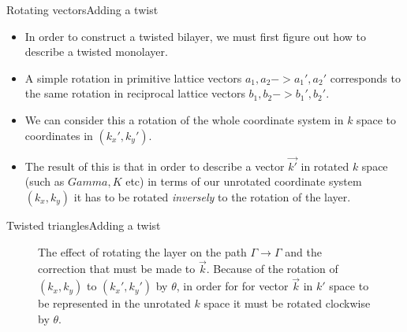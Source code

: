\documentclass[9pt]{beamer}
\begin{document}
\begin{frame}{Rotating vectors}{Adding a twist}
  \begin{itemize}
    \item In order to construct a twisted bilayer, we must first figure out how to describe a twisted monolayer.

    \item A simple rotation in primitive lattice vectors $a_1, a_2 -> a_1', a_2'$ corresponds to the same rotation in reciprocal lattice vectors $b_1, b_2 -> b_1', b_2'$.

    \item We can consider this a rotation of the whole coordinate system in $k$ space to coordinates in $(k_x', k_y')$.

    \item The result of this is that in order to describe a vector $\vec{k'}$ in rotated $k$ space (such as $Gamma, K$ etc) in terms of our unrotated coordinate system $(k_x, k_y)$ it has to be rotated \textit{inversely} to the rotation of the layer.
  \end{itemize}
\end{frame}

\begin{frame}{Twisted triangles}{Adding a twist}
  \begin{figure}
  \centering
    \caption{The effect of rotating the layer on the path $\Gamma \rightarrow \Gamma$ and the correction that must be made to $\vec{k}$. Because of the rotation of $(k_x, k_y)$ to $(k_x', k_y')$ by $\theta$, in order for for vector $\vec{k}$ in $k'$ space to be represented in the unrotated $k$ space it must be rotated clockwise by $\theta$.}
  \end{figure}
\end{frame}
\end{document}

